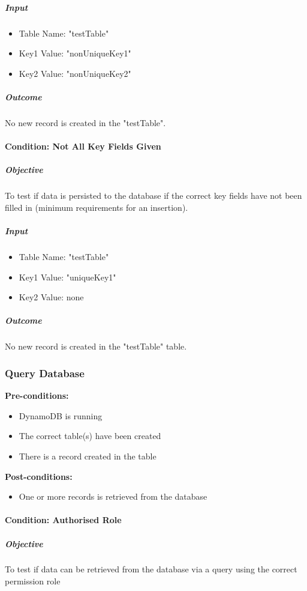 \documentclass{article}
\begin{document}
				\subparagraph{Input}
					\begin{itemize}
						\item Table Name: "testTable"
						\item Key1 Value: "nonUniqueKey1"
						\item Key2 Value: "nonUniqueKey2"
					\end{itemize}
					
				\subparagraph{Outcome}
					No new record is created in the "testTable".
				
			\paragraph{Condition: Not All Key Fields Given}
				\subparagraph{Objective}
					To test if data is persisted to the database if the correct key fields have not been filled in (minimum requirements for an insertion).
					
				\subparagraph{Input}
				\begin{itemize}
					\item Table Name: "testTable"
					\item Key1 Value: "uniqueKey1"
					\item Key2 Value: none
				\end{itemize}
				
				\subparagraph{Outcome}
					No new record is created in the "testTable" table.
			
		\subsubsection{Query Database}
			\textbf{Pre-conditions:}
			\begin{itemize}
				\item DynamoDB is running
				\item The correct table(s) have been created
				\item There is a record created in the table
			\end{itemize}
			\textbf{Post-conditions:}
			\begin{itemize}
				\item One or more records is retrieved from the database
			\end{itemize}
			
			\paragraph{Condition: Authorised Role}
				\subparagraph{Objective}
					To test if data can be retrieved from the database via a query using the correct permission role
				
\end{document}
